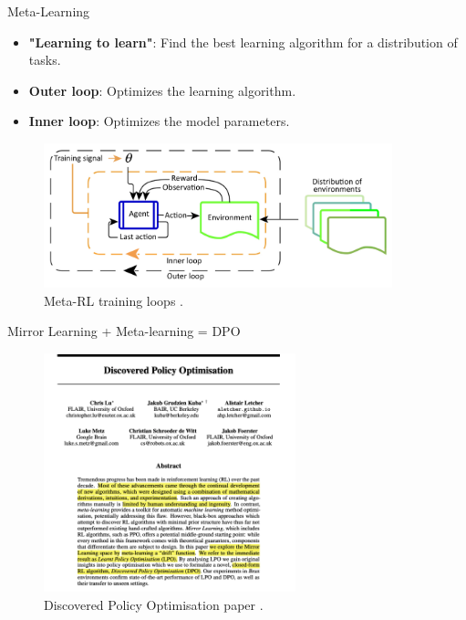 \documentclass[9pt]{beamer}
\begin{document}
\begin{frame}{Meta-Learning}

    \vspace{1em}  %
    \begin{itemize}
      \item \textbf{"Learning to learn"}: Find the best learning algorithm for a distribution of tasks.
        \pause
    \vspace{1em}  %
        \item \textbf{Outer loop}: Optimizes the learning algorithm.
    \vspace{1em}  %
        \item \textbf{Inner loop}: Optimizes the model parameters.
    \vspace{1em}  %
    \end{itemize}
        \pause
  \begin{figure}
    \centering
    \includegraphics[width=0.9\textwidth]{figures/meta-learning.png}
    \caption{Meta-RL training loops \cite{weng2019meta}.}
    \label{fig:trl2}
  \end{figure}

\end{frame}


\begin{frame}{Mirror Learning + Meta-learning = DPO}
  \begin{figure}
    \centering
    \includegraphics[width=0.65\textwidth]{figures/dpo_paper.png}
    \caption{Discovered Policy Optimisation paper \cite{dpo2022}.}
    \label{fig:trl3}
  \end{figure}
\end{frame}
\end{document}
